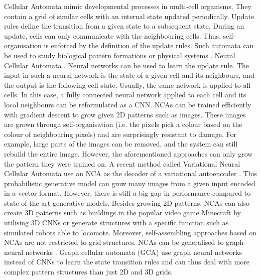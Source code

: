 Cellular Automata mimic developmental processes in multi-cell organisms.
They contain a grid of similar cells with an internal state updated periodically.
Update rules define the transition from a given state to a subsequent state.
During an update, cells can only communicate with the neighbouring cells.
Thus, self-organisation is enforced by the definition of the update rules.
Such automata can be used to study biological pattern formations  or physical systems .
Neural Cellular Automata .  Neural networks can be used to learn the update rule.
The input in such a neural network is the state of a given cell and its neighbours, and the output is the following cell state.
Usually, the same network is applied to all cells.
In this case, a fully connected neural network applied to each cell and its local neighbours can be reformulated as a CNN.
NCAs can be trained efficiently with gradient descent to grow given 2D patterns such as images.
These images are grown through self-organisation (i.e. the pixels pick a colour based on the colour of neighbouring pixels) and are surprisingly resistant to damage.
For example, large parts of the images can be removed, and the system can still rebuild the entire image.
However, the aforementioned approaches can only grow the pattern they were trained on.
A recent method called Variational Neural Cellular Automata  use an NCA as the decoder of a variational autoencoder .
This probabilistic generative model can grow many images from a given input encoded in a vector format.
However, there is still a big gap in performance compared to state-of-the-art generative models.
Besides growing 2D patterns, NCAs can also create 3D patterns such as buildings in the popular video game Minecraft by utilising 3D CNNs  or generate structures with a specific function such as simulated robots able to locomote.
Moreover, self-assembling approaches based on NCAs are not restricted to grid structures.
NCAs can be generalised to graph neural networks .
Graph cellular automata (GCA) use graph neural networks  instead of CNNs to learn the state transition rules and can thus deal with more complex pattern structures than just 2D and 3D grids.
